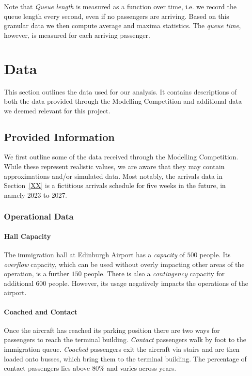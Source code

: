 \documentclass[10pt]{article}
\begin{document}
Note that \textit{Queue length} is measured as a function over time, i.e. we record the queue length every second, even if no passengers are arriving. Based on this granular data we then compute average and maxima statistics. The \textit{queue time}, however, is measured for each arriving passenger.


\section{Data}
This section outlines the data used for our analysis. It contains descriptions of both the data provided through the Modelling Competition and additional data we deemed relevant for this project.

\subsection{Provided Information}

We first outline some of the data received through the Modelling Competition. While these represent realistic values, we are aware that they may contain approximations and/or simulated data. Most notably, the arrivals data in Section~\ref{XX} is a fictitious arrivals schedule for five weeks in the future, in namely 2023 to 2027. 

\subsubsection{Operational Data}

\paragraph{Hall Capacity}
The immigration hall at Edinburgh Airport has a \textit{capacity} of $500$ people. Its \textit{overflow} capacity, which can be used without overly impacting other areas of the operation, is a further $150$ people. There is also a \textit{contingency} capacity for additional $600$ people. However, its usage negatively impacts the operations of the airport.

\paragraph{Coached and Contact}
Once the aircraft has reached its parking position there are two ways for passengers to reach the terminal building. \textit{Contact} passengers walk by foot to the immigration queue. \textit{Coached} passengers exit the aircraft via stairs and are then loaded onto busses, which bring them to the terminal building. The percentage of contact passengers lies above 80\% and varies across years.
\end{document}
